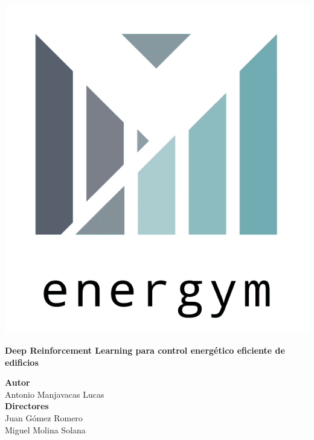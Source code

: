 \begin{titlepage}
 
\setlength{\centeroffset}{-0.5\oddsidemargin}
\addtolength{\centeroffset}{0.5\evensidemargin}
\thispagestyle{empty}

\noindent\hspace*{\centeroffset}\begin{minipage}{\textwidth}

\centering

\vspace{3.3cm}

\includegraphics[scale=0.2]{imagenes/logo_energym.png} 
\vspace{0.5cm}


{\LARGE\bfseries Deep Reinforcement Learning para control energético eficiente de edificios\\
}
\end{minipage}

\vspace{2.5cm}
\noindent\hspace*{\centeroffset}\begin{minipage}{\textwidth}
\centering

\textbf{Autor}\\ {Antonio Manjavacas Lucas}\\[2.5ex]
\textbf{Directores}\\
{Juan Gómez Romero\\
Miguel Molina Solana}\\[2cm]
\end{minipage}

\end{titlepage}



